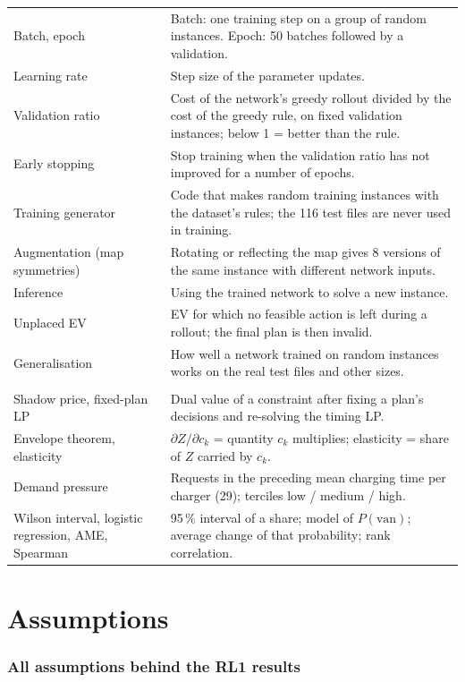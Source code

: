 \documentclass[11pt,a4paper]{article}
\newcommand{\pct}{\,\%}
\begin{document}
\begin{xltabular}{\textwidth}{@{}>{\raggedright\arraybackslash}p{4.0cm}X@{}}
Batch, epoch & Batch: one training step on a group of random instances. Epoch: 50 batches followed by a validation. \\
Learning rate & Step size of the parameter updates. \\
Validation ratio & Cost of the network's greedy rollout divided by the cost of the greedy rule, on fixed validation instances; below 1 = better than the rule. \\
Early stopping & Stop training when the validation ratio has not improved for a number of epochs. \\
Training generator & Code that makes random training instances with the dataset's rules; the 116 test files are never used in training. \\
Augmentation (map symmetries) & Rotating or reflecting the map gives 8 versions of the same instance with different network inputs. \\
Inference & Using the trained network to solve a new instance. \\
Unplaced EV & EV for which no feasible action is left during a rollout; the final plan is then invalid. \\
Generalisation & How well a network trained on random instances works on the real test files and other sizes. \\
 \\
Shadow price, fixed-plan LP & Dual value of a constraint after fixing a plan's decisions and re-solving the timing LP. \\
Envelope theorem, elasticity & $\partial Z/\partial c_k$ = quantity $c_k$ multiplies; elasticity = share of $Z$ carried by $c_k$. \\
Demand pressure & Requests in the preceding mean charging time per charger (29); terciles low / medium / high. \\
Wilson interval, logistic regression, AME, Spearman & 95\pct{} interval of a share; model of $P(\text{van})$; average change of that probability; rank correlation. \\
\bottomrule
\end{xltabular}

\clearpage
\part{Assumptions}
\section{All assumptions behind the RL1 results}
\label{sec:assumptions}
\end{document}
